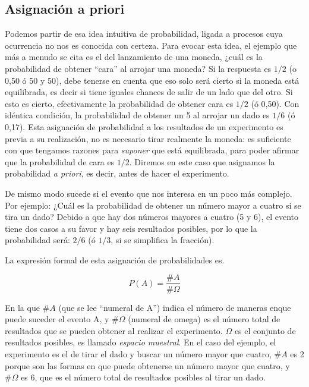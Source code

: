 \documentclass[]{book}
\begin{document}
\hypertarget{asignacion-a-priori}{%
\subsection{Asignación a priori}\label{asignacion-a-priori}}

Podemos partir de esa idea intuitiva de probabilidad, ligada a procesos
cuya ocurrencia no nos es conocida con certeza. Para evocar esta idea,
el ejemplo que más a menudo se cita es el del lanzamiento de una moneda,
¿cuál es la probabilidad de obtener ``cara'' al arrojar una moneda? Si la
respuesta es \(1/2\) (o 0,50 ó 50 y 50), debe tenerse en cuenta que eso solo
será cierto si la moneda está equilibrada, es decir si tiene iguales
chances de salir de un lado que del otro. Si esto es cierto,
efectivamente la probabilidad de obtener cara es \(1/2\) (ó 0,50). Con
idéntica condición, la probabilidad de obtener un 5 al arrojar un dado
es \(1/6\) (ó 0,17). Esta asignación de probabilidad a los resultados de un
experimento es previa a su realización, no es necesario tirar realmente
la moneda: es suficiente con que tengamos razones para \emph{suponer} que
está equilibrada, para poder afirmar que la probabilidad de cara es \(1/2\).
Diremos en este caso que asignamos la probabilidad \emph{a priori}, es decir,
antes de hacer el experimento.

De mismo modo sucede si el evento que nos interesa en un poco más
complejo. Por ejemplo: ¿Cuál es la probabilidad de obtener un número
mayor a cuatro si se tira un dado? Debido a que hay dos números mayores
a cuatro (5 y 6), el evento tiene dos casos a su favor y hay seis
resultados posibles, por lo que la probabilidad será: \(2/6\) (ó \(1/3\), si se
simplifica la fracción).

La expresión formal de esta asignación de probabilidades es.

\[P(A)=\frac{\#A}{\#\Omega}\]

En la que \(\#A\) (que se lee ``numeral de A'') indica el número de maneras enque puede suceder el evento A, y \(\#\Omega\) (numeral de omega) es el número
total de resultados que se pueden obtener al realizar el experimento. \(\Omega\)
es el conjunto de resultados posibles, es llamado \emph{espacio muestral}. En
el caso del ejemplo, el experimento es el de tirar el dado y buscar un
número mayor que cuatro, \(\#A\) es 2 porque son las formas en que puede
obtenerse un número mayor que cuatro, y \(\#\Omega\) es 6, que es el número total
de resultados posibles al tirar un dado.
\end{document}
